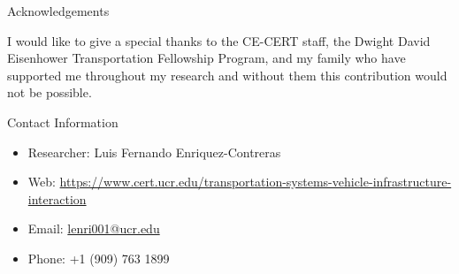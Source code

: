 \documentclass[final, 36 pt]{beamer}
\newlength{\onecolwid}
\begin{document}
\begin{frame}[t]
\begin{columns}[t]
\begin{column}{\onecolwid}


\begin{block}{Acknowledgements}

I would like to give a special thanks to the CE-CERT staff, the Dwight David Eisenhower Transportation Fellowship Program, and my family who have supported me throughout my research and without them this contribution would not be possible. \\

\end{block}




\begin{alertblock}{Contact Information}
	
	\begin{itemize}
		\item Researcher: Luis Fernando Enriquez-Contreras
		\item Web: \href{https://www.cert.ucr.edu/transportation-systems-vehicle-infrastructure-interaction}{https://www.cert.ucr.edu/transportation-systems-vehicle-infrastructure-interaction}
		\item Email: \href{lenri001@ucr.edu}{lenri001@ucr.edu}
		\item Phone: +1 (909) 763 1899
	\end{itemize}
	
\end{alertblock}

\begin{center}
	\begin{tabular}{ccc}
	\end{tabular}
\end{center}

\end{column} %

\end{columns} %

\end{frame} %
\end{document}
